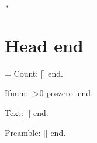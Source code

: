 \documentclass{article}
\begin{document}
\tableofcontents

\hbox{x}

\section{Head \pdfxformname\pdflastxform{} end}

\makeatletter
\count@=\pdfxformname\pdflastxform\relax
Count: [\the\count@] end.
\makeatother

Ifnum: [\ifnum\pdfxformname\pdflastxform>0 pos\else zero\fi] end.

Text: [\pdfxformname\pdflastxform] end.

Preamble: [\pdfxformname\logoform] end.
\end{document}
